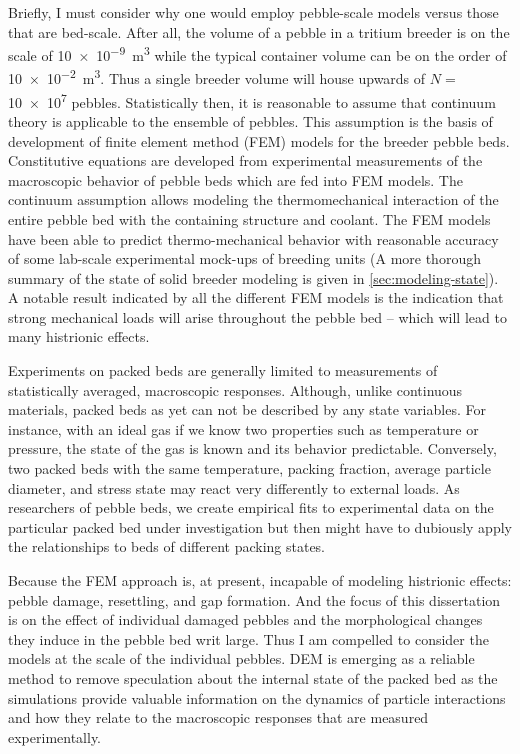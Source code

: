 Briefly, I must consider why one would employ pebble-scale models versus those that are bed-scale. After all, the volume of a pebble in a tritium breeder is on the scale of \SI{10e-9}{\cubic\meter} while the typical container volume can be on the order of \SI{10e-2}{\cubic\meter}.\cite{Cho2008}  Thus a single breeder volume will house upwards of $N =$\num{10e7} pebbles. Statistically then, it is reasonable to assume that continuum theory is applicable to the ensemble of pebbles. This assumption is the basis of development of finite element method (FEM) models for the breeder pebble beds. Constitutive equations are developed from experimental measurements of the macroscopic behavior of pebble beds which are fed into FEM models. The continuum assumption allows modeling the thermomechanical interaction of the entire pebble bed with the containing structure and coolant. The FEM models have been able to predict thermo-mechanical behavior with reasonable accuracy of some lab-scale experimental mock-ups of breeding units (A more thorough summary of the state of solid breeder modeling is given in \cref{sec:modeling-state}).\cite{DiMaio20081287,Zaccari20081282,Gan:2009vn} A notable result indicated by all the different FEM models is the indication that strong mechanical loads will arise throughout the pebble bed -- which will lead to many histrionic effects. 

Experiments on packed beds are generally limited to measurements of statistically averaged, macroscopic responses. Although, unlike continuous materials, packed beds as yet can not be described by any state variables. For instance, with an ideal gas if we know two properties such as temperature or pressure, the state of the gas is known and its behavior predictable. Conversely, two packed beds with the same temperature, packing fraction, average particle diameter, and stress state may react very differently to external loads. As researchers of pebble beds, we create empirical fits to experimental data on the particular packed bed under investigation but then might have to dubiously apply the relationships to beds of different packing states. 

Because the FEM approach is, at present, incapable of modeling histrionic effects: pebble damage, resettling, and gap formation. And the focus of this dissertation is on the effect of individual damaged pebbles and the morphological changes they induce in the pebble bed writ large. Thus I am compelled to consider the models at the scale of the individual pebbles. DEM is emerging as a reliable method to remove speculation about the internal state of the packed bed as the simulations provide valuable information on the dynamics of particle interactions and how they relate to the macroscopic responses that are measured experimentally.




